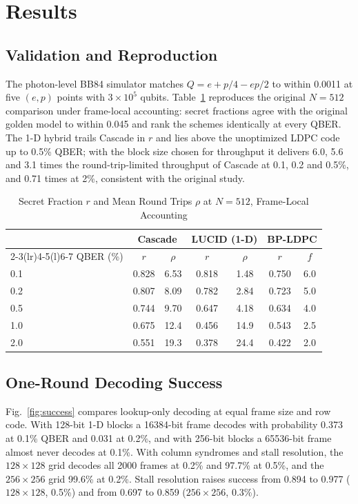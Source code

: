 \documentclass[conference]{IEEEtran}
\begin{document}
\section{Results}\label{sec:results}

\subsection{Validation and Reproduction}
The photon-level BB84 simulator matches $Q=e+p/4-ep/2$ to within 0.0011 at five $(e,p)$ points with $3\times10^{5}$ qubits. Table~\ref{tab:repro} reproduces the original $N=512$ comparison under frame-local accounting: secret fractions agree with the original golden model to within 0.045 and rank the schemes identically at every QBER. The 1-D hybrid trails Cascade in $r$ and lies above the unoptimized LDPC code up to 0.5\% QBER; with the block size chosen for throughput it delivers 6.0, 5.6 and 3.1 times the round-trip-limited throughput of Cascade at 0.1, 0.2 and 0.5\%, and 0.71 times at 2\%, consistent with the original study.

\begin{table}[t]
\caption{Secret Fraction $r$ and Mean Round Trips $\rho$ at $N=512$, Frame-Local Accounting}
\label{tab:repro}
\centering
\setlength{\tabcolsep}{4pt}
\begin{tabular}{@{}lcccccc@{}}
\toprule
& \multicolumn{2}{c}{Cascade} & \multicolumn{2}{c}{LUCID (1-D)} & \multicolumn{2}{c}{BP-LDPC}\\
\cmidrule(lr){2-3}\cmidrule(lr){4-5}\cmidrule(l){6-7}
QBER (\%) & $r$ & $\rho$ & $r$ & $\rho$ & $r$ & $f$\\
\midrule
0.1 & 0.828 & 6.53 & 0.818 & 1.48 & 0.750 & 6.0 \\
0.2 & 0.807 & 8.09 & 0.782 & 2.84 & 0.723 & 5.0 \\
0.5 & 0.744 & 9.70 & 0.647 & 4.18 & 0.634 & 4.0 \\
1.0 & 0.675 & 12.4 & 0.456 & 14.9 & 0.543 & 2.5 \\
2.0 & 0.551 & 19.3 & 0.378 & 24.4 & 0.422 & 2.0 \\
\bottomrule
\end{tabular}
\end{table}

\subsection{One-Round Decoding Success}
Fig.~\ref{fig:success} compares lookup-only decoding at equal frame size and row code. With 128-bit 1-D blocks a 16384-bit frame decodes with probability 0.373 at 0.1\% QBER and 0.031 at 0.2\%, and with 256-bit blocks a 65536-bit frame almost never decodes at 0.1\%. With column syndromes and stall resolution, the $128\times128$ grid decodes all 2000 frames at 0.2\% and 97.7\% at 0.5\%, and the $256\times256$ grid 99.6\% at 0.2\%. Stall resolution raises success from 0.894 to 0.977 ($128\times128$, 0.5\%) and from 0.697 to 0.859 ($256\times256$, 0.3\%).
\end{document}
